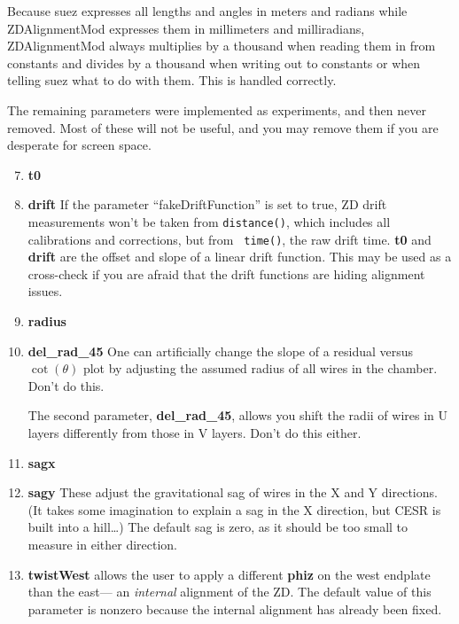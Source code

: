 \documentclass[12pt]{article}
\begin{document}
Because suez expresses all lengths and angles in meters and radians
while ZDAlignmentMod expresses them in millimeters and milliradians,
ZDAlignmentMod always multiplies by a thousand when reading them in
from constants and divides by a thousand when writing out to constants
or when telling suez what to do with them.  This is handled correctly.

The remaining parameters were implemented as experiments, and then
never removed.  Most of these will not be useful, and you may remove
them if you are desperate for screen space.
\begin{enumerate}\setcounter{enumi}{6}

  \item {\bf t0}

  \item {\bf drift} If the parameter ``fakeDriftFunction'' is set to
  true, ZD drift measurements won't be taken from {\tt distance()},
  which includes all calibrations and corrections, but from {\tt
  time()}, the raw drift time.  {\bf t0} and {\bf drift} are the
  offset and slope of a linear drift function.  This may be used as a
  cross-check if you are afraid that the drift functions are hiding
  alignment issues.

  \item {\bf radius}
  \item {\bf del\_rad\_45} One can artificially change the slope of a
  residual versus $\cot(\theta)$ plot by adjusting the assumed radius
  of all wires in the chamber.  Don't do this.

  The second parameter, {\bf del\_rad\_45}, allows you shift the radii
  of wires in U layers differently from those in V layers.  Don't do
  this either.

  \item {\bf sagx}
  \item {\bf sagy} These adjust the gravitational sag of wires in the
  X and Y directions.  (It takes some imagination to explain a sag in
  the X direction, but CESR is built into a hill\ldots)  The default
  sag is zero, as it should be too small to measure in either
  direction.

  \item {\bf twistWest} allows the user to apply a different {\bf
  phiz} on the west endplate than the east--- an {\it internal}
  alignment of the ZD.  The default value of this parameter is nonzero
  because the internal alignment has already been fixed.

\end{enumerate}
\end{document}
